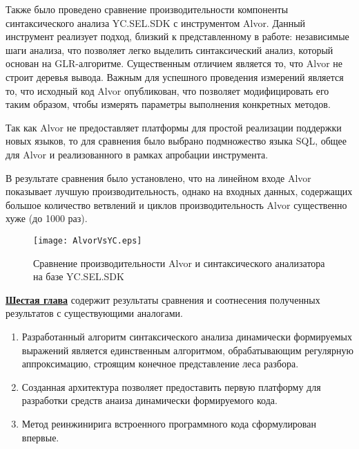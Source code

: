 Также было проведено сравнение производительности компоненты синтаксического анализа YC.SEL.SDK с инструментом Alvor. Данный инструмент реализует подход, близкий к представленному в работе: независимые шаги анализа, что позволяет легко выделить синтаксический анализ, который основан на GLR-алгоритме. Существенным отличием является то, что Alvor не строит деревья вывода. Важным для успешного проведения измерений является то, что исходный код Alvor опубликован, что позволяет модифицировать его таким образом, чтобы измерять параметры выполнения конкретных методов. 

Так как Alvor не предоставляет платформы для простой реализации поддержки новых языков, то для сравнения было выбрано подмножество языка SQL, общее для Alvor и реализованного в рамках апробации инструмента. 

В результате сравнения было установлено, что на линейном входе Alvor показывает лучшую производительность, однако на входных данных, содержащих большое количество ветвлений и циклов производительность Alvor существенно хуже (до 1000 раз).

\begin{figure}[h!]
 \centering
 \texttt{[image: AlvorVsYC.eps]}
 \caption{Сравнение производительности Alvor и синтаксического анализатора на базе YC.SEL.SDK}
 \label{fig:YCvsAlvor}
\end{figure}

\underline{\textbf{Шестая глава}} содержит результаты сравнения и соотнесения полученных результатов с существующими аналогами.
\begin{enumerate}
    \item Разработанный алгоритм синтаксического анализа динамически формируемых выражений является единственным алгоритмом, обрабатывающим регулярную аппроксимацию, строящим конечное представление леса разбора.
    \item Созданная архитектура позволяет предоставить первую платформу для разработки средств анаиза динамически формируемого кода.
    \item Метод реинжинирига встроенного программного кода сформулирован впервые.
\end{enumerate}



